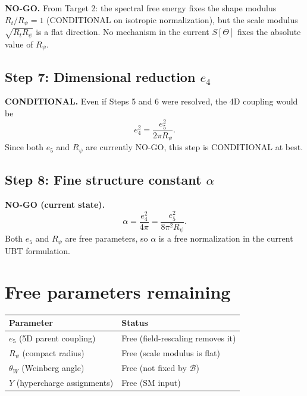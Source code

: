 \documentclass[11pt,a4paper]{article}
\begin{document}
\textbf{NO-GO.}
From Target 2: the spectral free energy fixes the shape modulus $R_t/R_\psi=1$
(CONDITIONAL on isotropic normalization), but the scale modulus
$\sqrt{R_t R_\psi}$ is a flat direction.  No mechanism in the current
$S[\Theta]$ fixes the absolute value of $R_\psi$.

\subsection{Step 7: Dimensional reduction $e_4$}

\textbf{CONDITIONAL.}
Even if Steps 5 and 6 were resolved, the 4D coupling would be
\begin{equation}
  e_4^2 = \frac{e_5^2}{2\pi R_\psi}.
\end{equation}
Since both $e_5$ and $R_\psi$ are currently NO-GO, this step is CONDITIONAL
at best.

\subsection{Step 8: Fine structure constant $\alpha$}

\textbf{NO-GO (current state).}
\begin{equation}
  \alpha = \frac{e_4^2}{4\pi}
  = \frac{e_5^2}{8\pi^2 R_\psi}.
\end{equation}
Both $e_5$ and $R_\psi$ are free parameters, so $\alpha$ is a free
normalization in the current UBT formulation.

\section{Free parameters remaining}

\begin{center}
\begin{tabular}{@{}ll@{}}
\toprule
Parameter & Status \\
\midrule
$e_5$ (5D parent coupling) & Free (field-rescaling removes it) \\
$R_\psi$ (compact radius) & Free (scale modulus is flat) \\
$\theta_W$ (Weinberg angle) & Free (not fixed by $\mathcal{B}$) \\
$Y$ (hypercharge assignments) & Free (SM input) \\
\bottomrule
\end{tabular}
\end{center}
\end{document}
